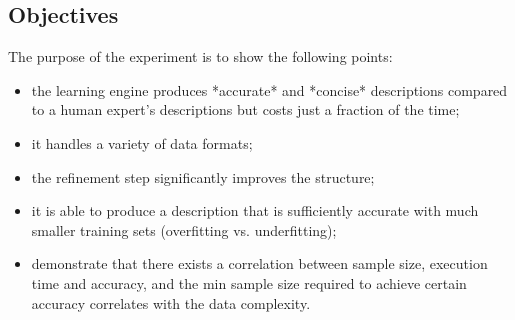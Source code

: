 \subsection{Objectives}

The purpose of the experiment is to show the following points:
\begin{itemize}
\item the learning engine produces *accurate* and *concise* descriptions compared to a human
expert's descriptions but costs just a fraction of the time; 
\item it handles a variety of data formats; 
\item the refinement step significantly improves the structure; 
\item it is able to produce a description that is sufficiently accurate with 
much smaller training sets (overfitting vs. underfitting); 
\item demonstrate that there exists a correlation between sample size, execution time and accuracy,
and the min sample size required to achieve certain accuracy correlates with the 
data complexity.
\end{itemize}

